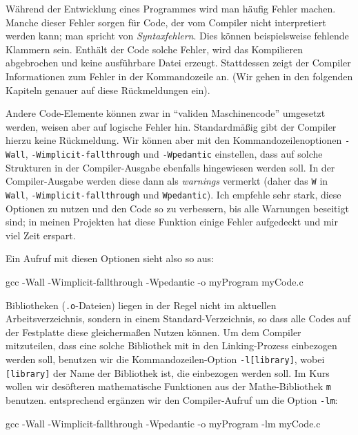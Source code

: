 Während der Entwicklung eines Programmes wird man häufig Fehler machen. Manche dieser Fehler sorgen für Code, der vom Compiler nicht interpretiert werden kann; man spricht \ua von \emph{Syntaxfehlern}. Dies können beispielsweise fehlende Klammern sein. Enthält der Code solche Fehler, wird das Kompilieren abgebrochen und keine ausführbare Datei erzeugt. Stattdessen zeigt der Compiler Informationen zum Fehler in der Kommandozeile an. (Wir gehen in den folgenden Kapiteln genauer auf diese Rückmeldungen ein).

Andere Code-Elemente können zwar in \enquote{validen Maschinencode} umgesetzt werden, weisen aber auf logische Fehler hin. Standardmäßig gibt der Compiler hierzu keine Rückmeldung. Wir können aber mit den Kommandozeilenoptionen \texttt{-Wall}, \texttt{-Wimplicit-fallthrough} und \texttt{-Wpedantic} einstellen, dass auf solche Strukturen in der Compiler-Ausgabe ebenfalls hingewiesen werden soll. In der Compiler-Ausgabe werden diese dann als \emph{warnings} vermerkt (daher das \texttt{W} in \texttt{Wall}, \texttt{-Wimplicit-fallthrough} und \texttt{Wpedantic}). Ich empfehle sehr stark, diese Optionen zu nutzen und den Code so zu verbessern, bis alle Warnungen beseitigt sind; in meinen Projekten hat diese Funktion einige Fehler aufgedeckt und mir viel Zeit erspart.

Ein Aufruf mit diesen Optionen sieht also so aus:
\begin{cmdbox}
gcc -Wall -Wimplicit-fallthrough -Wpedantic -o myProgram myCode.c
\end{cmdbox}

Bibliotheken (\eg \texttt{.o}-Dateien) liegen in der Regel nicht im aktuellen Arbeitsverzeichnis, sondern in einem Standard-Verzeichnis, so dass alle Codes auf der Festplatte diese gleichermaßen Nutzen können. Um dem Compiler mitzuteilen, dass eine solche Bibliothek mit in den Linking-Prozess einbezogen werden soll, benutzen wir die Kommandozeilen-Option \texttt{-l[library]}, wobei \texttt{[library]} der Name der Bibliothek ist, die einbezogen werden soll. Im Kurs wollen wir \eg desöfteren mathematische Funktionen aus der Mathe-Bibliothek \texttt{m} benutzen. entsprechend ergänzen wir den Compiler-Aufruf um die Option \texttt{-lm}:
\begin{cmdbox}
gcc -Wall -Wimplicit-fallthrough -Wpedantic -o myProgram -lm myCode.c
\end{cmdbox}

